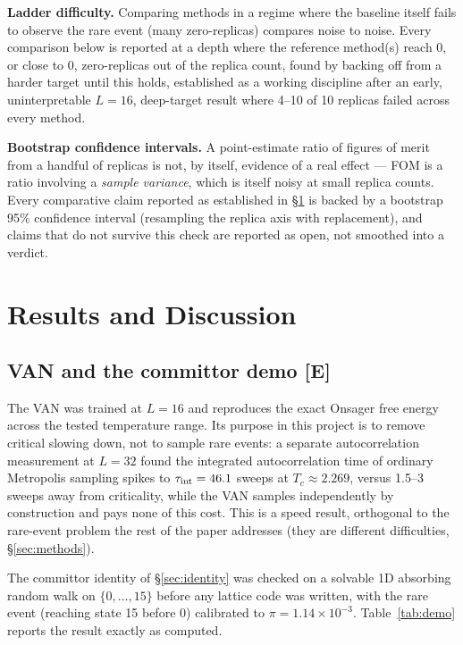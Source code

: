 \documentclass[a4paper,fleqn]{cas-sc}
\begin{document}
\textbf{Ladder difficulty.} Comparing methods in a regime where the baseline itself fails
to observe the rare event (many zero-replicas) compares noise to noise. Every comparison
below is reported at a depth where the reference method(s) reach 0, or close to 0,
zero-replicas out of the replica count, found by backing off from a harder target until
this holds, established as a working discipline after an early, uninterpretable
$L=16$, deep-target result where 4--10 of 10 replicas failed across every method.

\textbf{Bootstrap confidence intervals.} A point-estimate ratio of figures of merit from a
handful of replicas is not, by itself, evidence of a real effect --- FOM is a ratio
involving a \emph{sample variance}, which is itself noisy at small replica counts. Every
comparative claim reported as established in \S\ref{sec:results} is backed by a bootstrap
95\% confidence interval (resampling the replica axis with replacement), and claims that do
not survive this check are reported as open, not smoothed into a verdict.

\FloatBarrier

\section{Results and Discussion}\label{sec:results}

\subsection{VAN and the committor demo \textbf{[E]}}\label{sec:res-van}
The VAN was trained at $L=16$ and reproduces the exact Onsager free energy across the
tested temperature range. Its purpose in this project is to remove critical slowing down,
not to sample rare events: a separate autocorrelation measurement at $L=32$ found the
integrated autocorrelation time of ordinary Metropolis sampling spikes to $\tau_{\rm
	int}=46.1$ sweeps at $T_c\approx2.269$, versus 1.5--3 sweeps away from criticality, while
the VAN samples independently by construction and pays none of this cost. This is a speed
result, orthogonal to the rare-event problem the rest of the paper addresses (they are
different difficulties, \S\ref{sec:methods}).

The committor identity of \S\ref{sec:identity} was checked on a solvable 1D absorbing
random walk on $\{0,\dots,15\}$ before any lattice code was written, with the rare event
(reaching state 15 before 0) calibrated to $\pi=1.14\times10^{-3}$. Table~\ref{tab:demo}
reports the result exactly as computed.
\end{document}
